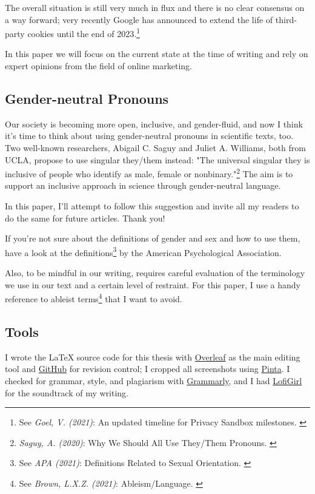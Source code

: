 The overall situation is still very much in flux and there is no clear consensus on a way forward; very recently Google has announced to extend the life of third-party cookies until the end of 2023.\footnote{See \textit{Goel, V. (2021)}: An updated timeline for Privacy Sandbox milestones. \cite{sandboxDelay}}

In this paper we will focus on the current state at the time of writing and rely on expert opinions from the field of online marketing.

\subsection{Gender-neutral Pronouns}

Our society is becoming more open, inclusive, and gender-fluid, and now I think it's time to think about using gender-neutral pronouns in scientific texts, too. Two well-known researchers, Abigail C. Saguy and Juliet A. Williams, both from UCLA, propose to use singular they/them instead: "The universal singular they is inclusive of people who identify as male, female or nonbinary."\footnote{\textit{Saguy, A. (2020)}: Why We Should All Use They/Them Pronouns. \cite{pronouns}} The aim is to support an inclusive approach in science through gender-neutral language. 

In this paper, I'll attempt to follow this suggestion and invite all my readers to do the same for future articles. Thank you!

If you're not sure about the definitions of gender and sex and how to use them, have a look at the definitions\footnote{See \textit{APA (2021)}: Definitions Related to Sexual Orientation. \cite{apaDefinitions}} by the American Psychological Association.

Also, to be mindful in our writing, requires careful evaluation of the terminology we use in our text and a certain level of restraint. For this paper, I use a handy reference to ableist terms\footnote{See \textit{Brown, L.X.Z. (2021)}: Ableism/Language. \cite{ableismLanguage}} that I want to avoid.

\subsection{Tools}

I wrote the LaTeX source code for this thesis with \href{https://www.overleaf.com/}{Overleaf} as the main editing tool and \href{https://github.com/chfrank-cgn/Bachelor-Arbeit}{GitHub} for revision control; I cropped all screenshots using \href{https://www.pinta-project.com/}{Pinta}. I checked for grammar, style, and plagiarism with \href{https://app.grammarly.com/}{Grammarly}, and I had \href{https://www.youtube.com/watch?v=5qap5aO4i9A}{LofiGirl} for the soundtrack of my writing.


